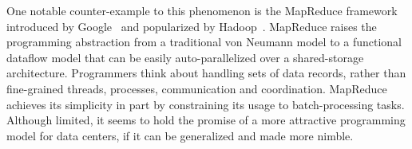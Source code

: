 \documentclass{sig-alternate}
\begin{document}
One notable counter-example to this phenomenon is the MapReduce framework introduced by Google~\cite{mapreduce} and popularized by Hadoop~\cite{hadoop}.  MapReduce raises the programming abstraction from a traditional von Neumann model to a functional dataflow model that can be easily auto-parallelized over a shared-storage architecture.   Programmers think about handling sets of data records, rather than fine-grained threads, processes, communication and coordination.  
MapReduce achieves its simplicity in part by constraining its usage to batch-processing tasks.  Although limited, it seems to hold the promise of a more attractive programming model for data centers, if it can be generalized and made more nimble.
% 
% 
% 
% 
% 
\end{document}
